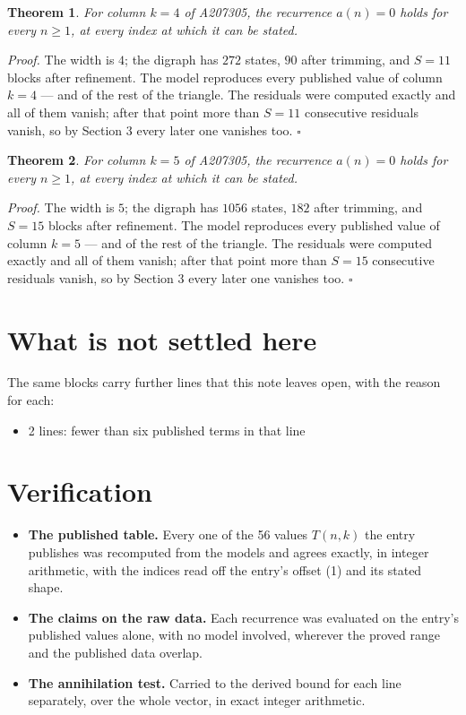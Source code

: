 \documentclass[11pt]{article}
\newtheorem{theorem}{Theorem}
\theoremstyle{definition}
\begin{document}
\begin{theorem} For column $k = 4$ of A207305, the recurrence $a(n) = 0$ holds for every $n \ge 1$, at every index at which it can be stated.\end{theorem}

{\itshape Proof.} The width is $4$; the digraph has $272$ states, $90$ after trimming, and $S = 11$ blocks after refinement. The model reproduces every published value of column $k = 4$ --- and of the rest of the triangle. The residuals were computed exactly and all of them vanish; after that point more than $S = 11$ consecutive residuals vanish, so by Section 3 every later one vanishes too. $\square$

\begin{theorem} For column $k = 5$ of A207305, the recurrence $a(n) = 0$ holds for every $n \ge 1$, at every index at which it can be stated.\end{theorem}

{\itshape Proof.} The width is $5$; the digraph has $1056$ states, $182$ after trimming, and $S = 15$ blocks after refinement. The model reproduces every published value of column $k = 5$ --- and of the rest of the triangle. The residuals were computed exactly and all of them vanish; after that point more than $S = 15$ consecutive residuals vanish, so by Section 3 every later one vanishes too. $\square$

\section{What is not settled here}

The same blocks carry further lines that this note leaves open, with the reason for each:

\begin{itemize}

\item 2 lines: fewer than six published terms in that line

\end{itemize}

\section{Verification}

\begin{itemize}

\item {\bfseries The published table.} Every one of the 56 values $T(n,k)$ the entry publishes was recomputed from the models and agrees exactly, in integer arithmetic, with the indices read off the entry's offset (1) and its stated shape.

\item {\bfseries The claims on the raw data.} Each recurrence was evaluated on the entry's published values alone, with no model involved, wherever the proved range and the published data overlap.

\item {\bfseries The annihilation test.} Carried to the derived bound for each line separately, over the whole vector, in exact integer arithmetic.

\end{itemize}
\end{document}
